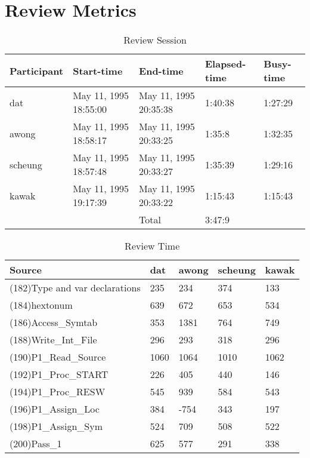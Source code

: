\section{Review Metrics}
\begin{table}[hb]
\begin{center}
\begin{tabular}{|l|l|l|l|l|}
\hline
Participant & Start-time & End-time & Elapsed-time & Busy-time \\
\hline
dat & May 11, 1995 18:55:00 & May 11, 1995 20:35:38 & 1:40:38 & 1:27:29 \\
awong & May 11, 1995 18:58:17 & May 11, 1995 20:33:25 & 1:35:8 & 1:32:35 \\
scheung & May 11, 1995 18:57:48 & May 11, 1995 20:33:27 & 1:35:39 & 1:29:16 \\
kawak & May 11, 1995 19:17:39 & May 11, 1995 20:33:22 & 1:15:43 & 1:15:43 \\
\hline
 & & Total & 3:47:9 & \\
\hline
\end{tabular}
\end{center}
\caption{Review Session}
\end{table}


\begin{table}[hb]
\begin{center}
\begin{tabular}{|l|l|l|l|l|}
\hline
Source & dat & awong & scheung & kawak\\
\hline
(182)Type and var declarations & 235 & 234 & 374 & 133\\
(184)hextonum & 639 & 672 & 653 & 534\\
(186)Access\_Symtab & 353 & 1381 & 764 & 749\\
(188)Write\_Int\_File & 296 & 293 & 318 & 296\\
(190)P1\_Read\_Source & 1060 & 1064 & 1010 & 1062\\
(192)P1\_Proc\_START & 226 & 405 & 440 & 146\\
(194)P1\_Proc\_RESW & 545 & 939 & 584 & 543\\
(196)P1\_Assign\_Loc & 384 & -754 & 343 & 197\\
(198)P1\_Assign\_Sym & 524 & 709 & 508 & 522\\
(200)Pass\_1 & 625 & 577 & 291 & 338\\
\hline
\end{tabular}
\end{center}
\caption{Review Time}
\end{table}

